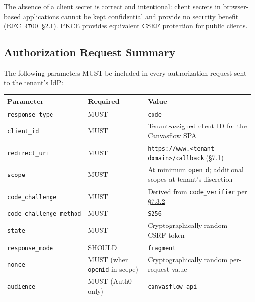 The absence of a client secret is correct and intentional: client secrets in
browser-based applications cannot be kept confidential and provide no security benefit
(\href{https://tools.ietf.org/html/rfc9700\#section-2.1}{RFC~9700~\S2.1}). 
PKCE provides equivalent CSRF protection for public clients.

\subsection{Authorization Request Summary}

The following parameters MUST be included in every authorization request sent to the
tenant's IdP:

\begin{longtable}{@{}llp{6cm}@{}}
\toprule
\textbf{Parameter} & \textbf{Required} & \textbf{Value} \\
\midrule
\endhead
\texttt{response\_type}       & MUST           & \texttt{code} \\[4pt]
\texttt{client\_id}           & MUST           & Tenant-assigned client ID for the Canvasflow SPA \\[4pt]
\texttt{redirect\_uri}        & MUST           & \texttt{https://www.<tenant-domain>/callback} (\S7.1) \\[4pt]
\texttt{scope}                & MUST           & At minimum \texttt{openid}; additional scopes at tenant's discretion \\[4pt]
\texttt{code\_challenge}      & MUST           & Derived from \texttt{code\_verifier} per \hyperref[sec:code-challenge-derivation]{\S7.3.2} \\[4pt]
\texttt{code\_challenge\_method} & MUST        & \texttt{S256} \\[4pt]
\texttt{state}                & MUST           & Cryptographically random CSRF token \\[4pt]
\texttt{response\_mode}       & SHOULD         & \texttt{fragment} \\[4pt]
\texttt{nonce}                & MUST (when \texttt{openid} in scope) & Cryptographically random per-request value \\[4pt]
\texttt{audience}             & MUST (Auth0 only) & \texttt{canvasflow-api} \\
\bottomrule
\end{longtable}
